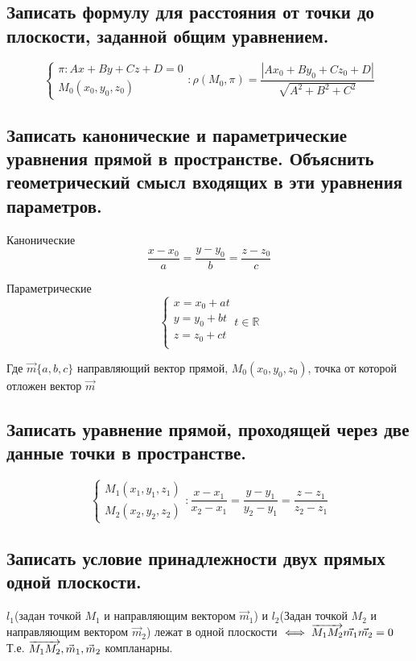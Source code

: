 \subsection{Записать формулу для расстояния от точки до плоскости, заданной общим уравнением. }

$$\begin{cases}\pi: Ax+By+Cz+D = 0\\M_0(x_0,y_0,z_0)\end{cases}: \rho(M_0,\pi) = 
\frac{ |Ax_0+By_0+Cz_0+D| }{\sqrt{A^2+B^2+C^2}}$$

\subsection{Записать канонические и параметрические уравнения прямой в пространстве. 
Объяснить геометрический смысл входящих в эти уравнения параметров.}

Канонические 
$$ \frac{x-x_0}{a} = \frac{y-y_0}{b} = \frac{z-z_0}{c}$$

Параметрические
$$\begin{cases}x = x_0 + at\\y = y_0 + bt\\z = z_0 + ct\\\end{cases} t \in \mathbb{R}$$

Где $\vec{m}\{a,b,c\}$ направляющий вектор прямой, $M_0(x_0,y_0,z_0)$, точка
от которой отложен вектор $\vec{m}$


\subsection{Записать уравнение прямой, проходящей через две данные точки в пространстве. }

$$\begin{cases}M_1(x_1,y_1,z_1)\\M_2(x_2,y_2,z_2)\end{cases}: 
\frac{x-x_1}{x_2-x_1} = \frac{y-y_1}{y_2-y_1} = \frac{z-z_1}{z_2-z_1}$$

\subsection{Записать условие принадлежности двух прямых одной плоскости.}

$l_1$(задан точкой $M_1$ и направляющим вектором $\vec{m}_1$) и $l_2$(Задан точкой $M_2$ и направляющим 
вектором $\vec{m}_2$) лежат в одной плоскости $\iff \overrightarrow{M_1M_2}\vec{m_1}\vec{m_2} = 0$
Т.е. $\overrightarrow{M_1M_2}, \vec{m}_1, \vec{m}_2$ компланарны. 

